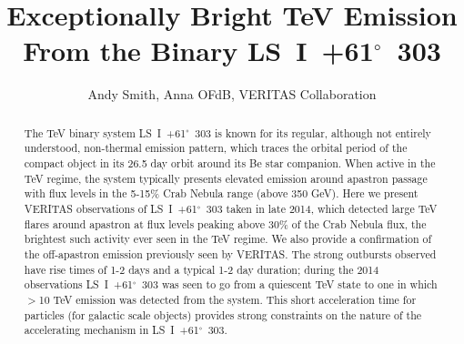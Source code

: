 \documentclass[preprint2]{aastex}
\newcommand{\lsi}{LS~I~+61$^{\circ}$~303}
\begin{document}

\title{Exceptionally Bright TeV Emission From the Binary \lsi{}}


\author{
Andy Smith,
Anna OFdB,
VERITAS Collaboration
}




\begin{abstract}
The TeV binary system \lsi{} is known for its regular, although not entirely understood, non-thermal emission pattern, which traces the orbital period of the compact object in its 26.5 day orbit around its Be star companion. When active in the TeV regime, the system typically presents elevated emission around apastron passage with flux levels in the 5-15$\%$ Crab Nebula range (above 350 GeV). Here we present VERITAS observations of \lsi{} taken in late 2014, which detected large TeV flares around apastron at flux levels peaking above 30$\%$ of the Crab Nebula flux, the brightest such activity ever seen in the TeV regime. We also provide a confirmation of the off-apastron emission previously seen by VERITAS. The strong outbursts observed have rise times of 1-2 days and a typical 1-2 day duration; during the 2014 observations \lsi{} was seen to go from a quiescent TeV state to one in which $>$10 TeV emission was detected from the system. This short acceleration time for particles (for galactic scale objects) provides strong constraints on the nature of the accelerating mechanism in \lsi{}.


\end{abstract}
\end{document}
